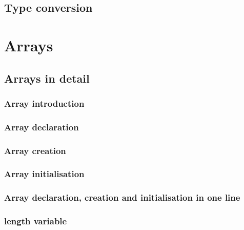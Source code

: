 \documentclass[14pt,fleqn]{extbook} %
\begin{document}
\section{Type conversion}



\chapter{Arrays}
\section{Arrays in detail}

\subsection{Array introduction}

\subsection{Array declaration}

\subsection{Array creation}

%
\subsection{Array initialisation}

\subsection{Array declaration, creation and initialisation in one line}

\subsection{length variable}

\end{document}
